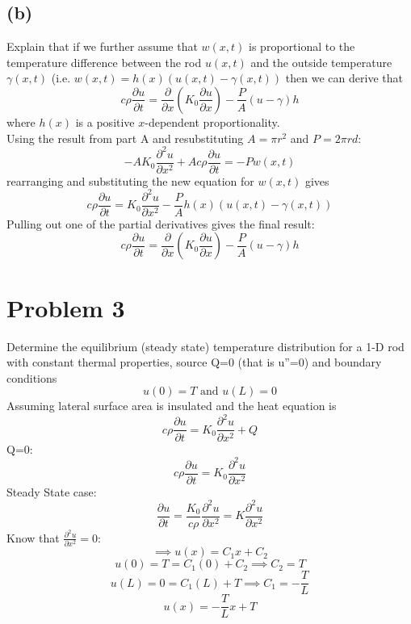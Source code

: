 \documentclass[preview,12pt]{article}
\begin{document}
    \subsection*{(b)}
        Explain that if we further assume that $w(x,t)$ is proportional to the temperature difference between the rod $u(x,t)$ and the outside temperature $\gamma(x,t)$ (i.e. $w(x,t)=h(x)(u(x,t)-\gamma(x,t))$ then we can derive that
        $$c\rho\frac{\partial u}{\partial t}=\frac{\partial}{\partial x}\left(K_0\frac{\partial u}{\partial x}\right)-\frac{P}{A}(u-\gamma)h$$
        where $h(x)$ is a positive $x$-dependent proportionality. \newline
        $$$$
        Using the result from part A and resubstituting $A=\pi r^2$ and $P=2\pi r d$:
        $$-AK_0\frac{\partial^2u}{\partial x^2}+Ac\rho \frac{\partial u}{\partial t}=-Pw(x,t)$$
        rearranging and substituting the new equation for $w(x,t)$ gives
        $$c\rho \frac{\partial u}{\partial t}=K_0\frac{\partial^2u}{\partial x^2}-\frac{P}{A}h(x)(u(x,t)-\gamma(x,t))$$
        Pulling out one of the partial derivatives gives the final result:
        $$c\rho\frac{\partial u}{\partial t}=\frac{\partial}{\partial x}\left(K_0\frac{\partial u}{\partial x}\right)-\frac{P}{A}(u-\gamma)h$$
    
\section*{Problem 3}
    Determine the equilibrium (steady state) temperature distribution for a 1-D rod with constant thermal properties, source Q=0 (that is u''=0) and boundary conditions
    $$u(0)=T \textrm{ and } u(L)=0$$
    Assuming lateral surface area is insulated and the heat equation is 
    $$c\rho\frac{\partial u}{\partial t}=K_0\frac{\partial^2u}{\partial x^2}+Q$$
    Q=0:
    $$c\rho\frac{\partial u}{\partial t}=K_0\frac{\partial^2u}{\partial x^2}$$
    Steady State case: 
    $$\frac{\partial u}{\partial t}=\frac{K_0}{c\rho}\frac{\partial^2u}{\partial x^2}=K\frac{\partial^2u}{\partial x^2}$$
    Know that $\frac{\partial^2u}{\partial x^2}=0$:
    $$\implies u(x)=C_1x+C_2$$
    $$u(0)=T=C_1(0)+C_2 \implies C_2=T$$
    $$u(L)=0=C_1(L)+T \implies C_1=-\frac{T}{L}$$
    $$u(x)=-\frac{T}{L}x+T$$
    
\end{document}
